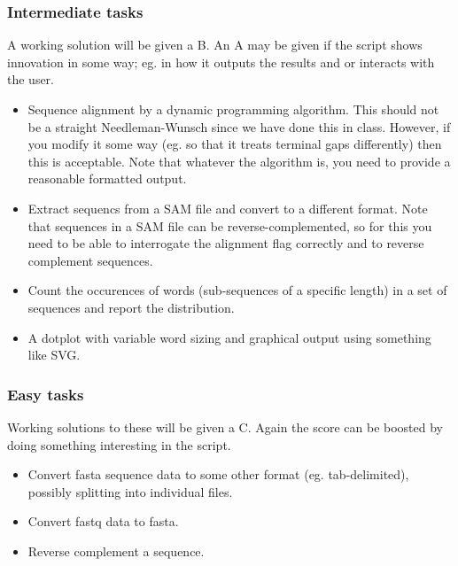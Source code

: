 \documentclass[11pt]{article}
\begin{document}
\subsubsection{Intermediate tasks}
A working solution will be given a B. An A may be given if the script shows
innovation in some way; eg. in how it outputs the results and or interacts
with the user.
\begin{itemize}
\item Sequence alignment by a dynamic programming algorithm. This should not
  be a straight Needleman-Wunsch since we have done this in class. However, if
  you modify it some way (eg. so that it treats terminal gaps differently)
  then this is acceptable. Note that whatever the algorithm is, you need to
  provide a reasonable formatted output.
\item Extract sequencs from a SAM file and convert to a different format. Note
  that sequences in a SAM file can be reverse-complemented, so for this you
  need to be able to interrogate the alignment flag correctly and to reverse
  complement sequences.
\item Count the occurences of words (sub-sequences of a specific length) in
  a set of sequences and report the distribution.
\item A dotplot with variable word sizing and graphical output using something
  like SVG.
\end{itemize}

\subsubsection{Easy tasks}
Working solutions to these will be given a C. Again the score can be boosted
by doing something interesting in the script.
\begin{itemize}
  \item Convert fasta sequence data to some other format (eg. tab-delimited),
    possibly splitting into individual files.
  \item Convert fastq data to fasta.
  \item Reverse complement a sequence.
\end{itemize}
\end{document}
